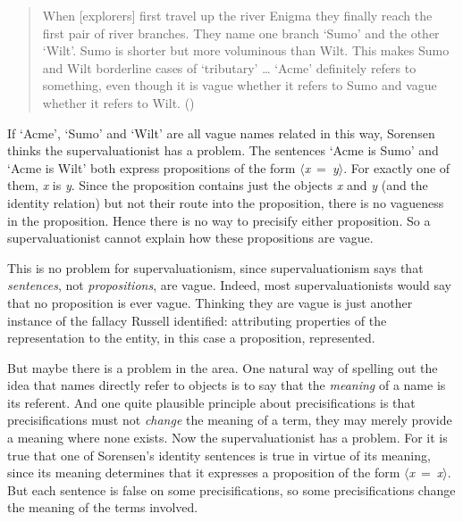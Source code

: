 \documentclass[
  10pt,
  letterpaper,
  DIV=11,
  numbers=noendperiod,
  twoside]{scrartcl}
\begin{document}
\begin{quote}
When {[}explorers{]} first travel up the river Enigma they finally reach
the first pair of river branches. They name one branch `Sumo' and the
other `Wilt'. Sumo is shorter but more voluminous than Wilt. This makes
Sumo and Wilt borderline cases of `tributary' \ldots{} `Acme' definitely
refers to something, even though it is vague whether it refers to Sumo
and vague whether it refers to Wilt.
()
\end{quote}

If `Acme', `Sumo' and `Wilt' are all vague names related in this way,
Sorensen thinks the supervaluationist has a problem. The sentences `Acme
is Sumo' and `Acme is Wilt' both express propositions of the form
\(\langle\)\emph{x}~=~\emph{y}\(\rangle\). For exactly one of them,
\emph{x} is \emph{y}. Since the proposition contains just the objects
\emph{x} and \emph{y} (and the identity relation) but not their route
into the proposition, there is no vagueness in the proposition. Hence
there is no way to precisify either proposition. So a supervaluationist
cannot explain how these propositions are vague.

This is no problem for supervaluationism, since supervaluationism says
that \emph{sentences}, not \emph{propositions}, are vague. Indeed, most
supervaluationists would say that no proposition is ever vague. Thinking
they are vague is just another instance of the fallacy Russell
identified: attributing properties of the representation to the entity,
in this case a proposition, represented.

But maybe there is a problem in the area. One natural way of spelling
out the idea that names directly refer to objects is to say that the
\emph{meaning} of a name is its referent. And one quite plausible
principle about precisifications is that precisifications must not
\emph{change} the meaning of a term, they may merely provide a meaning
where none exists. Now the supervaluationist has a problem. For it is
true that one of Sorensen's identity sentences is true in virtue of its
meaning, since its meaning determines that it expresses a proposition of
the form \(\langle\)\emph{x}~=~\emph{x}\(\rangle\). But each sentence is
false on some precisifications, so some precisifications change the
meaning of the terms involved.
\end{document}
